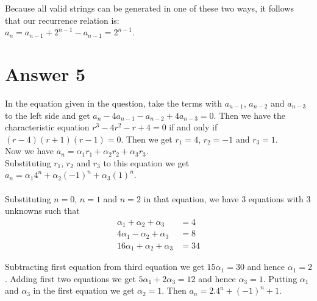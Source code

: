 \documentclass[12pt]{article}
\begin{document}
Because all valid strings can be generated in one of these two ways, it follows that our recurrence relation is:\\
$a_n=a_{n-1}+2^{n-1}-a_{n-1}=2^{n-1}$.
\section*{Answer 5}

In the equation given in the question, take the terms with $a_{n-1}$, $a_{n-2}$ and $a_{n-3}$ to the left side and get $a_{n}-4a_{n-1}-a_{n-2}+4a_{n-3}=0$. Then we have the characteristic equation $r^3-4r^2-r+4=0$ if and only if $(r-4)(r+1)(r-1)=0$. Then we get $r_1=4$, $r_2=-1$ and $r_3=1$.\\Now we have $a_n=\alpha_1 r_1+ \alpha_2 r_2+ \alpha_3 r_3$.\\Substituting $r_1$, $r_2$ and $r_3$ to this equation we get $a_n=\alpha_1 4^n+ \alpha_2 (-1)^n+ \alpha_3 (1)^n$.\\ \\
Substituting $n=0$, $n=1$ and $n=2$ in that equation, we have 3 equations with 3 unknowns such that
\begin{equation*}
\begin{split}
	\alpha_1   +  \alpha_2 + \alpha_3 & = 4\\
	4\alpha_1  -  \alpha_2 + \alpha_3 & = 8\\
	16\alpha_1 +  \alpha_2 + \alpha_3 & = 34
\end{split}
\end{equation*}

Subtracting first equation from third equation we get $15\alpha_1=30$ and hence $\alpha_1=2$.
Adding first two equations we get $5\alpha_1+2\alpha_3=12$  and hence $\alpha_3=1$. Putting $\alpha_1$ and $\alpha_3$ in the first equation we get $\alpha_2=1$. Then $a_n=2.4^n+(-1)^n+1$.\\ 
\end{document}
